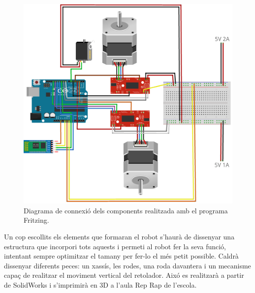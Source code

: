 \begin{figure}[H]
	\centering
	\includegraphics[scale=0.4]{RobotFritz}
	\caption{Diagrama de connexió dels components realitzada amb el programa Fritzing.}
	\label{fig:connexio1}
\end{figure}

Un cop escollits els elements que formaran el robot s'haurà de dissenyar una estructura que incorpori tots aquests i permeti al robot fer la seva funció, intentant sempre optimitzar el tamany per fer-lo el més petit possible. Caldrà dissenyar diferents peces: un xassís, les rodes, una roda davantera i un mecanisme capaç de realitzar el moviment vertical del retolador. Aixó es realitzarà a partir de SolidWorks i s'imprimirà en 3D a l'aula Rep Rap de l'escola. 

